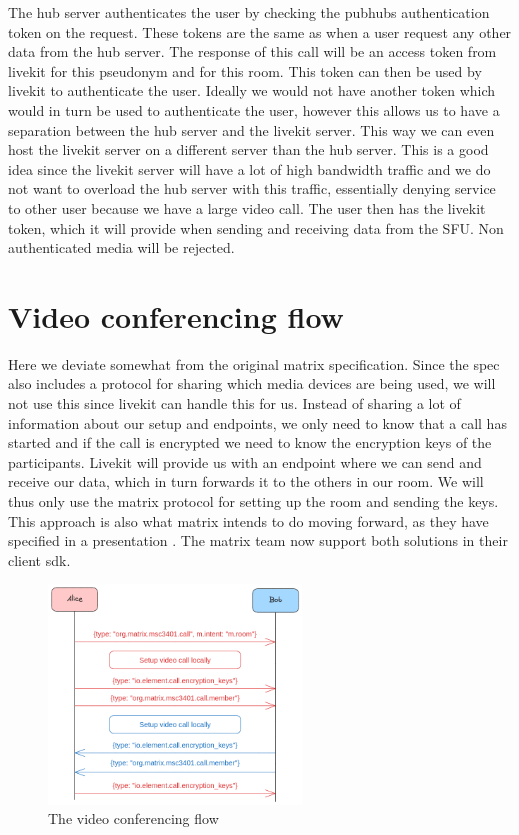 \documentclass{report}
\begin{document}
The hub server authenticates the user by checking the pubhubs authentication token on the request. These tokens are
the same as when a user request any other data from the hub server. The response of this call will be an
access token from livekit for this pseudonym and for this room. This token can then be used by livekit to
authenticate the user. Ideally we would not have another token which would in turn be used to authenticate the
user, however this allows us to have a separation between the hub server and the livekit server. This way we can
even host the livekit server on a different server than the hub server. This is a good idea since the
livekit server will have a lot of high bandwidth traffic and we do not want to overload the hub server with
this traffic, essentially denying service to other user because we have a large video call. The user then
has the livekit token, which it will provide when sending and receiving data from the SFU. Non authenticated
media will be rejected.


\section{Video conferencing flow}
Here we deviate somewhat from the original matrix specification. Since the spec also includes a protocol for
sharing which media devices are being used, we will not use this since livekit can handle this for us. Instead
of sharing a lot of information about our setup and endpoints, we only need to know that a call has started and
if the call is encrypted we need to know the encryption keys of the participants. Livekit will provide us with
an endpoint where we can send and receive our data, which in turn forwards it to the others in our room. We
will thus only use the matrix protocol for setting up the room and sending the keys. This approach is also what
matrix intends to do moving forward, as they have specified in a presentation . The
matrix team now support both solutions in their client sdk.

\begin{figure}
\centering
\includegraphics[width=0.6\textwidth]{img/Callflow.excalidraw.png}
\caption{The video conferencing flow}
\label{fig:video-conference-flow}
\end{figure}
\end{document}
